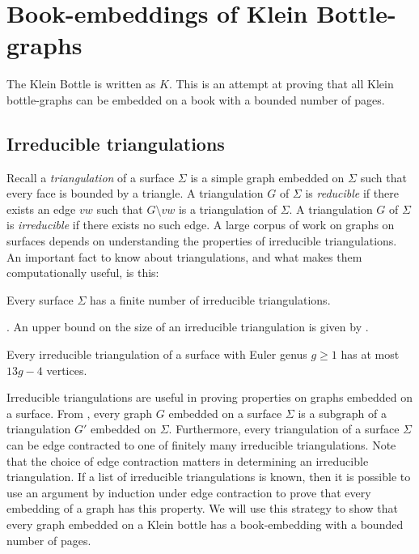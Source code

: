 \section{Book-embeddings of Klein Bottle-graphs}
The Klein Bottle is written as $K$.
This is an attempt at proving that all Klein bottle-graphs can be embedded on a book with a bounded number of pages.

\subsection{Irreducible triangulations}
Recall a \textit{triangulation} of a surface $\Sigma$ is a simple graph embedded on $\Sigma$ such that every face is bounded by a triangle. A triangulation $G$ of $\Sigma$ is \textit{reducible} if there exists an edge $vw$ such that $G \setminus vw$ is a triangulation of $\Sigma$. A triangulation $G$ of $\Sigma$ is \textit{irreducible} if there exists no such edge. A large corpus of work on graphs on surfaces depends on understanding the properties of irreducible triangulations. An important fact to know about triangulations, and what makes them computationally useful, is this:

\begin{theorem}
    Every surface $\Sigma$ has a finite number of irreducible triangulations.
\end{theorem}

. An upper bound on the size of an irreducible triangulation is given by \textcite{joretIrreducibleTriangulationsAre2010}.

\begin{theorem}\textcite{joretIrreducibleTriangulationsAre2010}
    Every irreducible triangulation of a surface with Euler genus $g \geq 1$ has at most $13g - 4$ vertices. 
\end{theorem}

Irreducible triangulations are useful in proving properties on graphs embedded on a surface. From , every graph $G$ embedded on a surface $\Sigma$ is a subgraph of a triangulation $G'$ embedded on $\Sigma$. Furthermore, every triangulation of a surface $\Sigma$ can be edge contracted to one of finitely many irreducible triangulations. Note that the choice of edge contraction matters in determining an irreducible triangulation. If a list of irreducible triangulations is known, then it is possible to use an argument by induction under edge contraction to prove that every embedding of a graph has this property. We will use this strategy to show that every graph embedded on a Klein bottle has a book-embedding with a bounded number of pages. 

